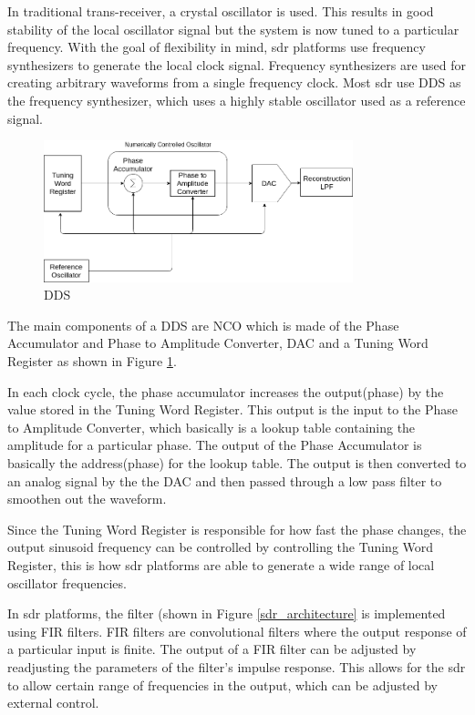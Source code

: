\begin{itemize}
In traditional trans-receiver, a crystal oscillator is used.
This results in good stability of the local oscillator signal but the system is now tuned to a particular frequency.
With the goal of flexibility in mind, \ac{sdr} platforms use frequency synthesizers to generate the local clock signal.
Frequency synthesizers are used for creating arbitrary waveforms from a single frequency clock.
Most \ac{sdr} use \ac{DDS} as the frequency synthesizer, which uses a highly stable oscillator used as a reference signal.



\begin{figure}[h!]
\centering
\includegraphics[width=0.8\textwidth]{Figure/DDS.png}
\caption{DDS}
\label{dds}
\end{figure}

The main components of a \ac{DDS} are \ac{NCO} which is made of the Phase Accumulator and Phase to Amplitude Converter, \ac{DAC} and a Tuning Word Register as shown in Figure \ref{dds}.

In each clock cycle, the phase accumulator increases the output(phase) by the value stored in the Tuning Word Register.
This output is the input to the Phase to Amplitude Converter, which basically is a lookup table containing the amplitude for a particular phase.
The output of the Phase Accumulator is basically the address(phase) for the lookup table.
The output is then converted to an analog signal by the the \ac{DAC} and then passed through a low pass filter to smoothen out the waveform.

Since the Tuning Word Register is responsible for how fast the phase changes, the output sinusoid frequency can be controlled by controlling the Tuning Word Register, this is how \ac{sdr} platforms are able to generate a wide range of local oscillator frequencies.

In \ac{sdr} platforms, the filter (shown in Figure \ref{sdr_architecture} is implemented using \ac{FIR} filters.
\ac{FIR} filters are convolutional filters where the output response of a particular input is finite.
The output of a \ac{FIR} filter can be adjusted by readjusting the parameters of the filter's impulse response.
This allows for the \ac{sdr} to allow certain range of frequencies in the output, which can be adjusted by external control.


\end{itemize}
